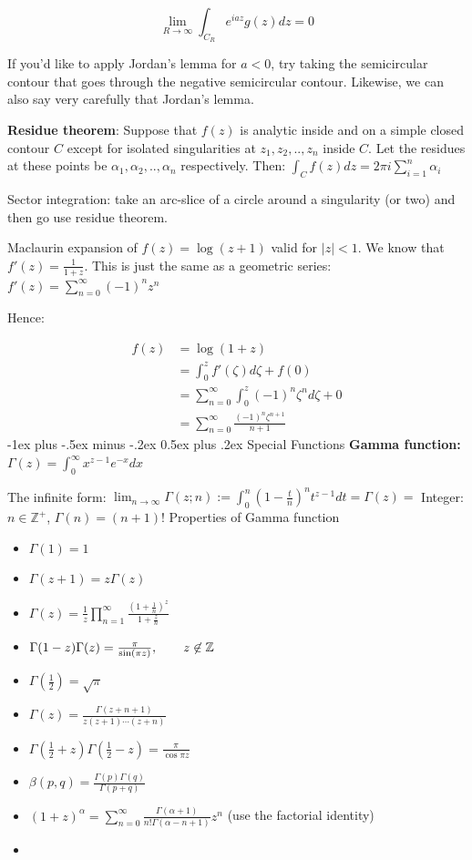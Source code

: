 \documentclass{article}
\makeatletter
\theoremstyle{definition}
\renewcommand{\section}{\@startsection{section}{1}{0mm}%
	{-1ex plus -.5ex minus -.2ex}%
	{0.5ex plus .2ex}%
	{\normalfont\large\bfseries}}
\makeatother
\begin{document}
\begin{multicols}{3}
$$\lim_{R \to \infty} \int_{C_R}e^{iaz}g(z) dz = 0$$

If you'd like to apply Jordan's lemma for $a<0$, try taking the semicircular contour that goes through the negative semicircular contour. Likewise, we can also say very carefully that Jordan's lemma.

\textbf{Residue theorem}: Suppose that $f(z)$ is analytic inside and on a simple closed contour $C$ except for isolated singularities at $z_1, z_2,..,z_n$ inside $C$. Let the residues at these points be $\alpha_1, \alpha_2,..,\alpha_n$ respectively. Then:
$\int_C f(z) dz = 2 \pi i \sum_{i=1}^n \alpha_i$


Sector integration: take an arc-slice of a circle around a singularity (or two) and then go use residue theorem.

Maclaurin expansion of $f(z) = \log(z+1)$ valid for $|z|<1$. We know that $f'(z) = \frac{1}{1+z}$. This is just the same as a geometric series: $f'(z) = \sum_{n=0}^\infty (-1)^n z^n$

Hence:

\begin{align}
f(z) &= \log(1+z) \\ 
& = \int_{0}^z f'(\zeta) d\zeta + f(0) \\ 
& = \sum_{n=0}^\infty \int_{0}^z (-1)^n\zeta^n d\zeta + 0 \\ 
&  = \sum_{n=0}^\infty \frac{(-1)^n\zeta^{n+1}}{n+1}  
\end{align}
\section{Special Functions}
\textbf{Gamma function:} $\Gamma(z) = \int_0^\infty x^{z-1} e^{-x} dx$

The infinite form:
$\lim_{n\to\infty} \Gamma(z;n) := \int_{0}^{n} (1-\frac{t}{n})^n t^{z-1} dt = \Gamma(z) =  $
Integer: $n \in \mathbb{Z}^+$, $\Gamma(n) = (n+1)!$ 
Properties of Gamma function
\begin{itemize}
	\item $\Gamma(1) = 1$
	\item $\Gamma(z+1) = z \Gamma(z)$ 
	\item $\Gamma (z)={\frac {1}{z}}\prod _{n=1}^{\infty }{\frac {\left(1+{\frac {1}{n}}\right)^{z}}{1+{\frac {z}{n}}}}$
	\item $\Gamma (1-z)\Gamma (z)={\pi  \over \sin(\pi z)},\qquad z\not \in \mathbb{Z} $
	\item $\Gamma(\frac{1}{2}) = \sqrt{\pi }$
	\item $ \Gamma (z)={\frac {\Gamma (z+n+1)}{z(z+1)\cdots (z+n)}}$
	\item $\Gamma(\frac{1}{2} + z) \Gamma(\frac{1}{2} - z) = \frac{\pi}{\cos \pi z}$ 
	\item $\beta(p,q) = \frac{\Gamma(p)\Gamma(q)}{\Gamma(p+q)}$
	\item $(1+z)^\alpha = \sum_{n=0}^\infty \frac{\Gamma(\alpha+1)}{n!\Gamma(\alpha-n+1)}z^n$ (use the factorial identity)
	\item 
\end{itemize}


\end{multicols}
\end{document}
